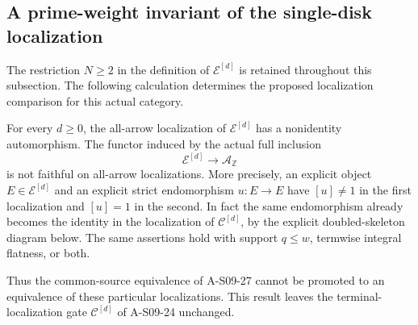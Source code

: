 \subsection{A prime-weight invariant of the single-disk localization}

The restriction $N\geq2$ in the definition of
$\mathcal E^{[d]}$ is retained throughout this subsection.
The following calculation determines the proposed localization
comparison for this actual category.

\begin{theorem}
\label{AS0928}
For every $d\geq0$, the all-arrow localization of
$\mathcal E^{[d]}$ has a nonidentity automorphism.
The functor induced by the actual full inclusion
\[
 \mathcal E^{[d]}\longrightarrow\mathcal A_{\mathbb Z}
 \tag{S09.147}
\]
is not faithful on all-arrow localizations.
More precisely, an explicit object $E\in\mathcal E^{[d]}$
and an explicit strict endomorphism $u:E\to E$ have
$[u]\ne1$ in the first localization and $[u]=1$ in the
second. In fact the same endomorphism already becomes the identity
in the localization of $\mathcal C^{[d]}$, by the explicit
doubled-skeleton diagram below. The same assertions hold
with support $q\leq w$, termwise integral flatness, or both.

Thus the common-source equivalence of A-S09-27 cannot be
promoted to an equivalence of these particular localizations.
This result leaves the terminal-localization gate
$\mathcal C^{[d]}$ of A-S09-24 unchanged.
\end{theorem}

